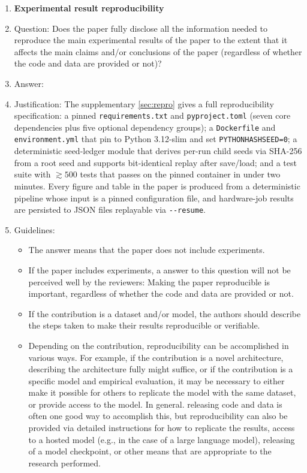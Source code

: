 \begin{enumerate}
    \item {\bf Experimental result reproducibility}
    \item[] Question: Does the paper fully disclose all the information needed to reproduce the main experimental results of the paper to the extent that it affects the main claims and/or conclusions of the paper (regardless of whether the code and data are provided or not)?
    \item[] Answer: \answerYes{} %
    \item[] Justification: The supplementary \cref{sec:repro} gives a
        full reproducibility specification: a pinned \texttt{requirements.txt}
        and \texttt{pyproject.toml} (seven core dependencies plus five
        optional dependency groups); a \texttt{Dockerfile} and
        \texttt{environment.yml} that pin to Python 3.12-slim and set
        \texttt{PYTHONHASHSEED=0}; a deterministic seed-ledger module
        that derives per-run child seeds via SHA-256 from a root seed and
        supports bit-identical replay after save/load; and a test suite
        with ${\gtrsim}500$ tests that passes on the pinned container in
        under two minutes. Every figure and table in the paper is
        produced from a deterministic pipeline whose input is a pinned
        configuration file, and hardware-job results are persisted to
        JSON files replayable via \texttt{-{}-resume}.
    \item[] Guidelines:
    \begin{itemize}
        \item The answer \answerNA{} means that the paper does not include experiments.
        \item If the paper includes experiments, a \answerNo{} answer to this question will not be perceived well by the reviewers: Making the paper reproducible is important, regardless of whether the code and data are provided or not.
        \item If the contribution is a dataset and\slash or model, the authors should describe the steps taken to make their results reproducible or verifiable.
        \item Depending on the contribution, reproducibility can be accomplished in various ways. For example, if the contribution is a novel architecture, describing the architecture fully might suffice, or if the contribution is a specific model and empirical evaluation, it may be necessary to either make it possible for others to replicate the model with the same dataset, or provide access to the model. In general. releasing code and data is often one good way to accomplish this, but reproducibility can also be provided via detailed instructions for how to replicate the results, access to a hosted model (e.g., in the case of a large language model), releasing of a model checkpoint, or other means that are appropriate to the research performed.

\end{itemize}
\end{enumerate}
